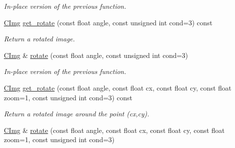 \begin{DoxyCompactItemize}
\begin{DoxyCompactList}\small\item\em In-\/place version of the previous function. \end{DoxyCompactList}\item 
\hyperlink{structcimg__library_1_1_c_img}{C\-Img} \hyperlink{structcimg__library_1_1_c_img_aaa91237f26c67cf66f6eda7c415f78ae}{get\-\_\-rotate} (const float angle, const unsigned int cond=3) const 
\begin{DoxyCompactList}\small\item\em Return a rotated image. \end{DoxyCompactList}\item 
\hypertarget{structcimg__library_1_1_c_img_a49cf43e728c25716e3882fc6968552c1}{\hyperlink{structcimg__library_1_1_c_img}{C\-Img} \& \hyperlink{structcimg__library_1_1_c_img_a49cf43e728c25716e3882fc6968552c1}{rotate} (const float angle, const unsigned int cond=3)}\label{structcimg__library_1_1_c_img_a49cf43e728c25716e3882fc6968552c1}

\begin{DoxyCompactList}\small\item\em In-\/place version of the previous function. \end{DoxyCompactList}\item 
\hyperlink{structcimg__library_1_1_c_img}{C\-Img} \hyperlink{structcimg__library_1_1_c_img_a9f0fe40ff2240e2ef3805e3884c790a2}{get\-\_\-rotate} (const float angle, const float cx, const float cy, const float zoom=1, const unsigned int cond=3) const 
\begin{DoxyCompactList}\small\item\em Return a rotated image around the point ({\ttfamily cx},{\ttfamily cy}). \end{DoxyCompactList}\item 
\hypertarget{structcimg__library_1_1_c_img_a3ceb47fd1c1eec978ee782f653130533}{\hyperlink{structcimg__library_1_1_c_img}{C\-Img} \& \hyperlink{structcimg__library_1_1_c_img_a3ceb47fd1c1eec978ee782f653130533}{rotate} (const float angle, const float cx, const float cy, const float zoom=1, const unsigned int cond=3)}\label{structcimg__library_1_1_c_img_a3ceb47fd1c1eec978ee782f653130533}


\end{DoxyCompactItemize}
